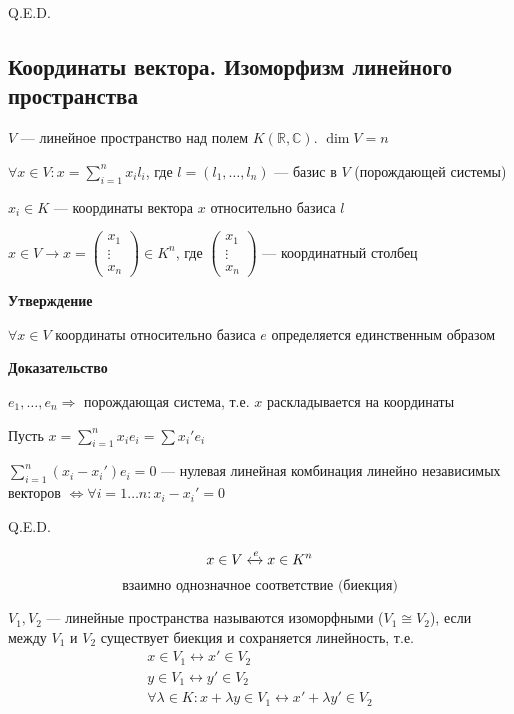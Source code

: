 \documentclass[twoside]{book}
\begin{document}
\hfill Q.E.D.

\subsection{Координаты вектора. Изоморфизм линейного пространства}

\(V\) --- линейное пространство над полем \(K (\mathbb{R}, \mathbb{C})\). \(\dim V = n\)

\(\forall x \in V: x = \sum\limits_{i = 1}^{n} x_i l_i\), где \(l = (l_1, \ldots, l_n)\) --- базис в \(V\) (порождающей системы)

\(x_i \in K\) --- координаты вектора \(x\) относительно базиса \(l\)

\(x \in V \longrightarrow x =
\begin{pmatrix}
    x_{1}  \\
    \vdots \\
    x_{n}
\end{pmatrix} \in K^n\), где \(
\begin{pmatrix}
    x_{1}  \\
    \vdots \\
    x_{n}
\end{pmatrix}
\) --- координатный столбец

\textbf{Утверждение}

\(\forall x \in V\) координаты относительно базиса \(e\) определяется единственным образом

\textbf{Доказательство}

\(e_1, \ldots, e_n \Rightarrow\) порождающая система, т.е. \(x\) раскладывается на координаты

Пусть \(x = \sum\limits_{i = 1}^{n} x_i e_i = \sum\limits x_i' e_i\)

\(\sum\limits_{i = 1}^{n} (x_i - x_i') e_i = 0\) --- нулевая линейная комбинация линейно независимых векторов \(\Leftrightarrow \forall i = 1 \ldots n: x_i - x_i' = 0\)

\hfill Q.E.D.

\[
    x \in V \xleftrightarrow{e} x \in K^n \\
\]
\[
    \text{взаимно однозначное соответствие (биекция)}
\]

\(V_1, V_2\) --- линейные пространства называются изоморфными (\(V_1 \cong V_2\)), если между \(V_1\) и \(V_2\) существует биекция и сохраняется линейность, т.е.
\begin{gather*}
    x \in V_1 \longleftrightarrow x' \in V_2 \\
    y \in V_1 \longleftrightarrow y' \in V_2 \\
    \forall \lambda \in K: x + \lambda y \in V_1 \longleftrightarrow x' + \lambda y' \in V_2
\end{gather*}
\end{document}
